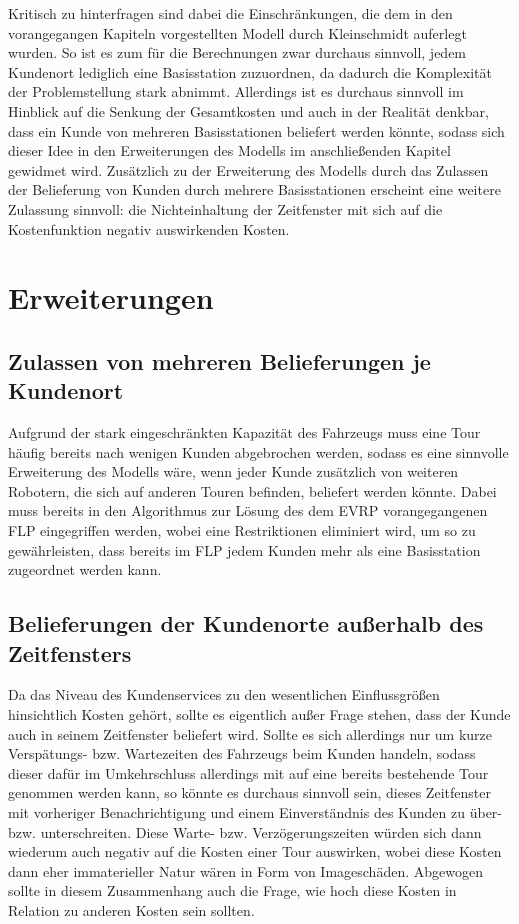 \documentclass[a4paper,12pt,parskip,bibtotoc,liststotoc]{article}
\begin{document}
Kritisch zu hinterfragen sind dabei die Einschränkungen, die dem in den vorangegangen Kapiteln vorgestellten Modell durch Kleinschmidt auferlegt wurden. 
So ist es zum für die Berechnungen zwar durchaus sinnvoll, jedem Kundenort lediglich eine Basisstation zuzuordnen, da dadurch die Komplexität der Problemstellung stark abnimmt. 
Allerdings ist es durchaus sinnvoll im Hinblick auf die Senkung der Gesamtkosten und auch in der Realität denkbar, dass ein Kunde von mehreren Basisstationen beliefert werden könnte, sodass sich dieser Idee in den Erweiterungen des Modells im anschließenden Kapitel gewidmet wird.
Zusätzlich zu der Erweiterung des Modells durch das Zulassen der Belieferung von Kunden durch mehrere Basisstationen erscheint eine weitere Zulassung sinnvoll: die Nichteinhaltung der Zeitfenster mit sich auf die Kostenfunktion negativ auswirkenden Kosten.


\newpage

\section{Erweiterungen}

\subsection{Zulassen von mehreren Belieferungen je Kundenort}

Aufgrund der stark eingeschränkten Kapazität des Fahrzeugs muss eine Tour häufig bereits nach wenigen Kunden abgebrochen werden, sodass es eine sinnvolle Erweiterung des Modells wäre, wenn jeder Kunde zusätzlich von weiteren Robotern, die sich auf anderen Touren befinden, beliefert werden könnte.
Dabei muss bereits in den Algorithmus zur Lösung des dem EVRP vorangegangenen  FLP eingegriffen werden, wobei eine Restriktionen eliminiert wird, um so zu gewährleisten, dass bereits im FLP jedem Kunden mehr als eine Basisstation zugeordnet werden kann.



\subsection{Belieferungen der Kundenorte außerhalb des Zeitfensters}

Da das Niveau des Kundenservices zu den wesentlichen Einflussgrößen hinsichtlich Kosten gehört, sollte es eigentlich außer Frage stehen, dass der Kunde auch in seinem Zeitfenster beliefert wird.
Sollte es sich allerdings nur um kurze Verspätungs- bzw. Wartezeiten des Fahrzeugs beim Kunden handeln, sodass dieser dafür im Umkehrschluss allerdings mit auf eine bereits bestehende Tour genommen werden kann, so könnte es durchaus sinnvoll sein, dieses Zeitfenster mit vorheriger Benachrichtigung und einem Einverständnis des Kunden zu über- bzw. unterschreiten.
Diese Warte- bzw. Verzögerungszeiten würden sich dann wiederum auch negativ auf die Kosten einer Tour auswirken, wobei diese Kosten dann eher immaterieller Natur wären in Form von Imageschäden. 
Abgewogen sollte in diesem Zusammenhang auch die Frage, wie hoch diese Kosten in Relation zu anderen Kosten sein sollten.
\end{document}
